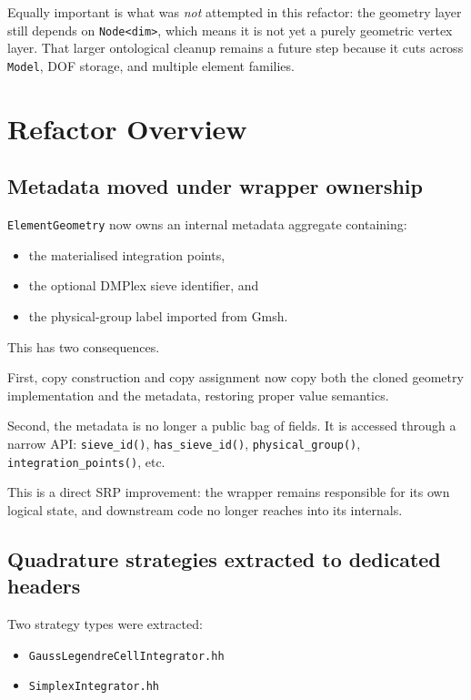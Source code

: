 Equally important is what was \emph{not} attempted in this refactor:
the geometry layer still depends on \texttt{Node<dim>}, which means it is not
yet a purely geometric vertex layer.  That larger ontological cleanup remains a
future step because it cuts across \texttt{Model}, DOF storage, and multiple
element families.


\section{Refactor Overview}
\label{sec:eg_refactor_overview}

\subsection{Metadata moved under wrapper ownership}

\texttt{ElementGeometry} now owns an internal metadata aggregate containing:

\begin{itemize}[nosep]
  \item the materialised integration points,
  \item the optional DMPlex sieve identifier, and
  \item the physical-group label imported from Gmsh.
\end{itemize}

This has two consequences.

First, copy construction and copy assignment now copy both the cloned geometry
implementation and the metadata, restoring proper value semantics.

Second, the metadata is no longer a public bag of fields.  It is accessed
through a narrow API:
\texttt{sieve\_id()}, \texttt{has\_sieve\_id()},
\texttt{physical\_group()}, \texttt{integration\_points()}, etc.

This is a direct SRP improvement: the wrapper remains responsible for its own
logical state, and downstream code no longer reaches into its internals.

\subsection{Quadrature strategies extracted to dedicated headers}

Two strategy types were extracted:

\begin{itemize}[nosep]
  \item \texttt{GaussLegendreCellIntegrator.hh}
  \item \texttt{SimplexIntegrator.hh}
\end{itemize}

